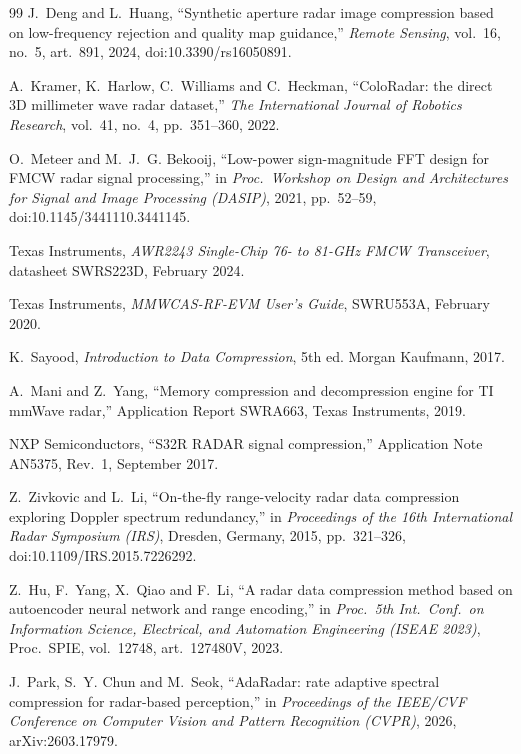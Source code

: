 \begin{thebibliography}{99}
J.~Deng and L.~Huang, ``Synthetic aperture radar image compression based on
low-frequency rejection and quality map guidance,'' \emph{Remote Sensing},
vol.~16, no.~5, art.~891, 2024, doi:10.3390/rs16050891.

A.~Kramer, K.~Harlow, C.~Williams and C.~Heckman, ``ColoRadar: the direct 3D
millimeter wave radar dataset,'' \emph{The International Journal of Robotics
Research}, vol.~41, no.~4, pp.~351--360, 2022.

O.~Meteer and M.~J.~G. Bekooij, ``Low-power sign-magnitude FFT design for
FMCW radar signal processing,'' in \emph{Proc.\ Workshop on Design and
Architectures for Signal and Image Processing (DASIP)}, 2021, pp.~52--59,
doi:10.1145/3441110.3441145.

Texas Instruments, \emph{AWR2243 Single-Chip 76- to 81-GHz FMCW Transceiver},
datasheet SWRS223D, February 2024.

Texas Instruments, \emph{MMWCAS-RF-EVM User's Guide}, SWRU553A, February
2020.

K.~Sayood, \emph{Introduction to Data Compression}, 5th ed. Morgan Kaufmann,
2017.

A.~Mani and Z.~Yang, ``Memory compression and decompression engine for TI
mmWave radar,'' Application Report SWRA663, Texas Instruments, 2019.

NXP Semiconductors, ``S32R RADAR signal compression,'' Application Note
AN5375, Rev.~1, September 2017.

Z.~Zivkovic and L.~Li, ``On-the-fly range-velocity radar data compression
exploring Doppler spectrum redundancy,'' in \emph{Proceedings of the 16th
International Radar Symposium (IRS)}, Dresden, Germany, 2015, pp.~321--326,
doi:10.1109/IRS.2015.7226292.

Z.~Hu, F.~Yang, X.~Qiao and F.~Li, ``A radar data compression method based on
autoencoder neural network and range encoding,'' in \emph{Proc.\ 5th Int.\
Conf.\ on Information Science, Electrical, and Automation Engineering (ISEAE
2023)}, Proc.\ SPIE, vol.~12748, art.~127480V, 2023.

J.~Park, S.~Y. Chun and M.~Seok, ``AdaRadar: rate adaptive spectral compression
for radar-based perception,'' in \emph{Proceedings of the IEEE/CVF Conference on
Computer Vision and Pattern Recognition (CVPR)}, 2026, arXiv:2603.17979.


\end{thebibliography}
